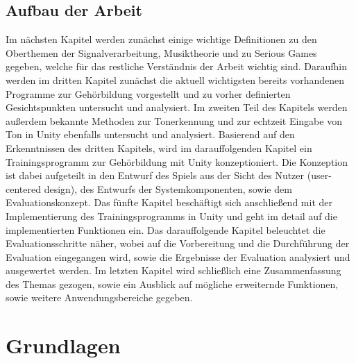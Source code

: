 \section{Aufbau der Arbeit}
Im nächsten Kapitel werden zunächst einige wichtige Definitionen zu den Oberthemen der Signalverarbeitung, Musiktheorie und zu Serious Games gegeben, welche für das restliche Verständnis der Arbeit wichtig sind. Daraufhin werden im dritten Kapitel zunächst die aktuell wichtigsten bereits vorhandenen Programme zur Gehörbildung vorgestellt und zu vorher definierten Gesichtspunkten untersucht und analysiert. Im zweiten Teil des Kapitels werden außerdem bekannte Methoden zur Tonerkennung und zur echtzeit Eingabe von Ton in Unity ebenfalls untersucht und analysiert. Basierend auf den Erkenntnissen des dritten Kapitels, wird im darauffolgenden Kapitel ein Trainingsprogramm zur Gehörbildung mit Unity konzeptioniert. Die Konzeption ist dabei aufgeteilt in 
den Entwurf des Spiels aus der Sicht des Nutzer (user-centered design), des Entwurfs der Systemkomponenten, sowie dem Evaluationskonzept. Das fünfte Kapitel beschäftigt sich anschließend mit der Implementierung des Trainingsprogramms in Unity und geht im detail auf die implementierten Funktionen ein. Das darauffolgende Kapitel beleuchtet die Evaluationsschritte näher, wobei auf die Vorbereitung und die Durchführung der Evaluation eingegangen wird, sowie die Ergebnisse der Evaluation analysiert und ausgewertet werden. Im letzten Kapitel wird schließlich eine Zusammenfassung des Themas gezogen, sowie ein Ausblick auf mögliche erweiternde Funktionen, sowie weitere Anwendungsbereiche gegeben.



\chapter{Grundlagen}
